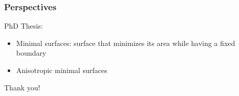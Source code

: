 \documentclass{beamer}
\begin{document}
\begin{frame}
    \frametitle{Perspectives}

    PhD Thesis:
    \begin{itemize}
        \item Minimal surfaces: surface that minimizes its area while having a
            fixed boundary
        \item Anisotropic minimal surfaces
    \end{itemize}
\end{frame}

\begin{frame}
    \begin{center}
        \huge{Thank you!}
    \end{center}
\end{frame}
\end{document}

